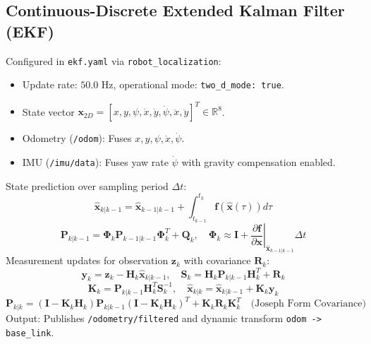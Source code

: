 \documentclass[10pt,a4paper]{article}
\begin{document}
\subsection{Continuous-Discrete Extended Kalman Filter (EKF)}
Configured in \texttt{ekf.yaml} via \texttt{robot\_localization}:
\begin{itemize}
    \item Update rate: $50.0\text{ Hz}$, operational mode: \texttt{two\_d\_mode: true}.
    \item State vector $\mathbf{x}_{2D} = [x, y, \psi, \dot{x}, \dot{y}, \dot{\psi}, \ddot{x}, \ddot{y}]^T \in \mathbb{R}^8$.
    \item Odometry (\texttt{/odom}): Fuses $x, y, \psi, \dot{x}, \dot{\psi}$.
    \item IMU (\texttt{/imu/data}): Fuses yaw rate $\dot{\psi}$ with gravity compensation enabled.
\end{itemize}
State prediction over sampling period $\Delta t$:
\begin{equation}
\hat{\mathbf{x}}_{k|k-1} = \hat{\mathbf{x}}_{k-1|k-1} + \int_{t_{k-1}}^{t_k} \mathbf{f}(\hat{\mathbf{x}}(\tau)) d\tau
\end{equation}
\begin{equation}
\mathbf{P}_{k|k-1} = \mathbf{\Phi}_k \mathbf{P}_{k-1|k-1} \mathbf{\Phi}_k^T + \mathbf{Q}_k, \quad \mathbf{\Phi}_k \approx \mathbf{I} + \left.\frac{\partial\mathbf{f}}{\partial\mathbf{x}}\right|_{\hat{\mathbf{x}}_{k-1|k-1}} \Delta t
\end{equation}
Measurement updates for observation $\mathbf{z}_k$ with covariance $\mathbf{R}_k$:
\begin{equation}
\mathbf{y}_k = \mathbf{z}_k - \mathbf{H}_k \hat{\mathbf{x}}_{k|k-1}, \quad \mathbf{S}_k = \mathbf{H}_k \mathbf{P}_{k|k-1} \mathbf{H}_k^T + \mathbf{R}_k
\end{equation}
\begin{equation}
\mathbf{K}_k = \mathbf{P}_{k|k-1} \mathbf{H}_k^T \mathbf{S}_k^{-1}, \quad \hat{\mathbf{x}}_{k|k} = \hat{\mathbf{x}}_{k|k-1} + \mathbf{K}_k \mathbf{y}_k
\end{equation}
\begin{equation}
\mathbf{P}_{k|k} = (\mathbf{I} - \mathbf{K}_k \mathbf{H}_k) \mathbf{P}_{k|k-1} (\mathbf{I} - \mathbf{K}_k \mathbf{H}_k)^T + \mathbf{K}_k \mathbf{R}_k \mathbf{K}_k^T \quad \text{(Joseph Form Covariance)}
\end{equation}
Output: Publishes \texttt{/odometry/filtered} and dynamic transform \texttt{odom -> base\_link}.
\end{document}
